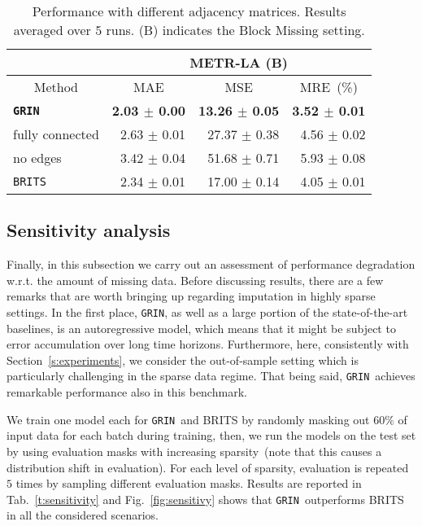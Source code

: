 \documentclass{article} \usepackage{iclr2022_conference,times}
\newcommand{\GRIL}{\texttt{GRIN}}
\begin{document}
\begin{table}[ht]
\vspace{-0.2cm}
\caption{Performance with  different adjacency matrices. Results averaged over $5$ runs. (B) indicates the Block Missing setting.}
\vspace{0.1cm}
\centering
\begin{tabular}{ l | r | r | r }
\toprule
\multicolumn{1}{c}{} & \multicolumn{3}{c}{METR-LA (B)}\\
\midrule
 \multicolumn{1}{c}{Method}&\multicolumn{1}{|c}{MAE} & \multicolumn{1}{|c}{MSE} & \multicolumn{1}{|c}{MRE~(\%)} \\
\midrule
\texttt{\textbf{\GRIL}}  & \textbf{2.03 {\tiny $\pm$ 0.00}} & \textbf{13.26 {\tiny $\pm$ 0.05}} & \textbf{3.52 {\tiny $\pm$ 0.01}} \\
\midrule[0.3pt]
fully connected & 2.63 {\tiny $\pm$ 0.01} & 27.37 {\tiny $\pm$ 0.38} & 4.56 {\tiny $\pm$ 0.02}\\
no edges & 3.42 {\tiny $\pm$ 0.04} & 51.68 {\tiny $\pm$ 0.71} & 5.93 {\tiny $\pm$ 0.08}\\
\midrule

\texttt{BRITS} & 2.34 {\tiny $\pm$ 0.01} & 17.00 {\tiny $\pm$ 0.14} & 4.05 {\tiny $\pm$ 0.01}\\
\bottomrule
\end{tabular}
\label{t:graph_ablation}
\end{table} 
\subsection{Sensitivity analysis}

Finally, in this subsection we carry out an assessment of performance degradation w.r.t. the amount of missing data. Before discussing results, there are a few remarks that are worth bringing up regarding imputation in highly sparse settings. In the first place, \GRIL, as well as a large portion of the state-of-the-art baselines, is an autoregressive model, which means that it might be subject to error accumulation over long time horizons. Furthermore, here, consistently with Section~\ref{s:experiments}, we consider the out-of-sample setting which is particularly challenging in the sparse data regime. That being said, \GRIL\  achieves remarkable performance also in this benchmark.

We train one model each for \GRIL\ and BRITS by randomly masking out $60\%$ of input data for each batch during training, then, we run the models on the test set by using evaluation masks with increasing sparsity~(note that this causes a distribution shift in evaluation). For each level of sparsity, evaluation is repeated $5$ times by sampling different evaluation masks. Results are reported in Tab.~\ref{t:sensitivity} and Fig.~\ref{fig:sensitivy} shows that \GRIL\ outperforms BRITS in all the considered scenarios.
\end{document}
